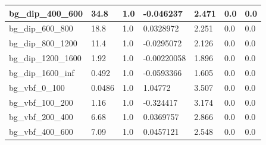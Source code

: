 \documentclass[a4paper, 10pt]{article}
\begin{document}
\begin{table}[H]
\begin{center}
\begin{tabular}{|m{23.0mm}|m{23.0mm}|m{18.0mm}|m{19.0mm}|m{19.0mm}|m{19.0mm}|m{19.0mm}|}
      \hline
      {\cellcolor{white}         bg\_dip\_400\_600}& {\cellcolor{white}         34.8}& {\cellcolor{white}         1.0}& {\cellcolor{white}         -0.046237}& {\cellcolor{white}         2.471}& {\cellcolor{green}         0.0}& {\cellcolor{green}         0.0}\\
      \hline
      {\cellcolor{white}         bg\_dip\_600\_800}& {\cellcolor{white}         18.8}& {\cellcolor{white}         1.0}& {\cellcolor{white}         0.0328972}& {\cellcolor{white}         2.251}& {\cellcolor{green}         0.0}& {\cellcolor{green}         0.0}\\
      \hline
      {\cellcolor{white}         bg\_dip\_800\_1200}& {\cellcolor{white}         11.4}& {\cellcolor{white}         1.0}& {\cellcolor{white}         -0.0295072}& {\cellcolor{white}         2.126}& {\cellcolor{green}         0.0}& {\cellcolor{green}         0.0}\\
      \hline
      {\cellcolor{white}         bg\_dip\_1200\_1600}& {\cellcolor{white}         1.92}& {\cellcolor{white}         1.0}& {\cellcolor{white}         -0.00220058}& {\cellcolor{white}         1.896}& {\cellcolor{green}         0.0}& {\cellcolor{green}         0.0}\\
      \hline
      {\cellcolor{white}         bg\_dip\_1600\_inf}& {\cellcolor{white}         0.492}& {\cellcolor{white}         1.0}& {\cellcolor{white}         -0.0593366}& {\cellcolor{white}         1.605}& {\cellcolor{green}         0.0}& {\cellcolor{green}         0.0}\\
      \hline
      {\cellcolor{white}         bg\_vbf\_0\_100}& {\cellcolor{white}         0.0486}& {\cellcolor{white}         1.0}& {\cellcolor{white}         1.04772}& {\cellcolor{white}         3.507}& {\cellcolor{green}         0.0}& {\cellcolor{green}         0.0}\\
      \hline
      {\cellcolor{white}         bg\_vbf\_100\_200}& {\cellcolor{white}         1.16}& {\cellcolor{white}         1.0}& {\cellcolor{white}         -0.324417}& {\cellcolor{white}         3.174}& {\cellcolor{green}         0.0}& {\cellcolor{green}         0.0}\\
      \hline
      {\cellcolor{white}         bg\_vbf\_200\_400}& {\cellcolor{white}         6.68}& {\cellcolor{white}         1.0}& {\cellcolor{white}         0.0369757}& {\cellcolor{white}         2.866}& {\cellcolor{green}         0.0}& {\cellcolor{green}         0.0}\\
      \hline
      {\cellcolor{white}         bg\_vbf\_400\_600}& {\cellcolor{white}         7.09}& {\cellcolor{white}         1.0}& {\cellcolor{white}         0.0457121}& {\cellcolor{white}         2.548}& {\cellcolor{green}         0.0}& {\cellcolor{green}         0.0}\\

\end{tabular}
\end{center}
\end{table}
\end{document}
